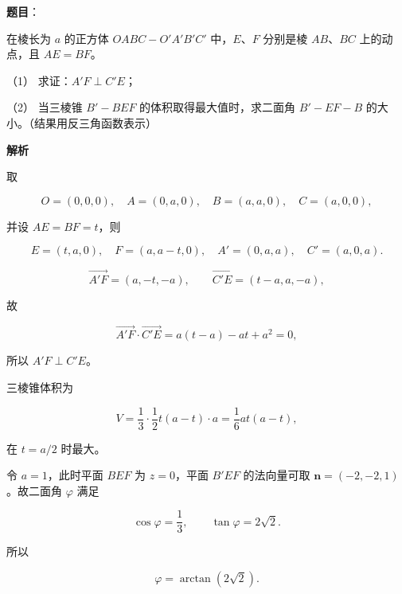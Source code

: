 \begin{answer}

\textbf{题目}：

在棱长为 $a$ 的正方体 $OABC-O'A'B'C'$ 中，$E\text{、}F$ 分别是棱 $AB\text{、}BC$ 上的动点，且 $AE=BF$。
\nopagebreak[4]
\begin{center}\end{center}
\nopagebreak[4]
（1） 求证：$A'F\perp C'E$；

（2） 当三棱锥 $B'-BEF$ 的体积取得最大值时，求二面角 $B'-EF-B$ 的大小。（结果用反三角函数表示）

\textbf{解析}

取

\nopagebreak[4]
\[
O=(0,0,0),\quad A=(0,a,0),\quad B=(a,a,0),\quad C=(a,0,0),
\]

并设 $AE=BF=t$，则

\nopagebreak[4]
\[
E=(t,a,0),\quad F=(a,a-t,0),\quad
A'=(0,a,a),\quad C'=(a,0,a).
\]


\nopagebreak[4]
\[
\overrightarrow{A'F}=(a,-t,-a),\qquad
\overrightarrow{C'E}=(t-a,a,-a),
\]

故

\nopagebreak[4]
\[
\overrightarrow{A'F}\cdot\overrightarrow{C'E}
=a(t-a)-at+a^2=0,
\]

所以 $A'F\perp C'E$。


三棱锥体积为

\nopagebreak[4]
\[
V=\frac13\cdot\frac12t(a-t)\cdot a
=\frac16at(a-t),
\]

在 $t=a/2$ 时最大。

令 $a=1$，此时平面 $BEF$ 为 $z=0$，平面 $B'EF$ 的法向量可取 $\boldsymbol n=(-2,-2,1)$。故二面角 $\varphi$ 满足

\nopagebreak[4]
\[
\cos\varphi=\frac13,\qquad \tan\varphi=2\sqrt2.
\]

所以

\nopagebreak[4]
\[
\varphi=\arctan(2\sqrt2).
\]



\end{answer}
